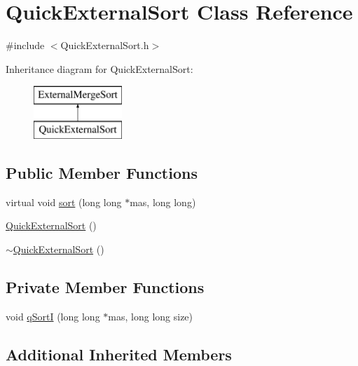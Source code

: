 \hypertarget{class_quick_external_sort}{}\section{Quick\+External\+Sort Class Reference}
\label{class_quick_external_sort}


{\ttfamily \#include $<$Quick\+External\+Sort.\+h$>$}

Inheritance diagram for Quick\+External\+Sort\+:\begin{figure}[H]
\begin{center}
\leavevmode
\includegraphics[height=2.000000cm]{class_quick_external_sort}
\end{center}
\end{figure}
\subsection*{Public Member Functions}
\begin{DoxyCompactItemize}
\item 
virtual void \hyperlink{class_quick_external_sort_adafdd4faded04218c1a131bf55e3c90d}{sort} (long long $\ast$mas, long long)
\item 
\hyperlink{class_quick_external_sort_ac31914e67af41c48b8fdcbcc076168ed}{Quick\+External\+Sort} ()
\item 
\hyperlink{class_quick_external_sort_a370e2be5e7c4afc31f9b230c2ee4d689}{$\sim$\+Quick\+External\+Sort} ()
\end{DoxyCompactItemize}
\subsection*{Private Member Functions}
\begin{DoxyCompactItemize}
\item 
void \hyperlink{class_quick_external_sort_a912abb7f2ccdadd7d97992f035e16183}{q\+SortI} (long long $\ast$mas, long long size)
\end{DoxyCompactItemize}
\subsection*{Additional Inherited Members}


